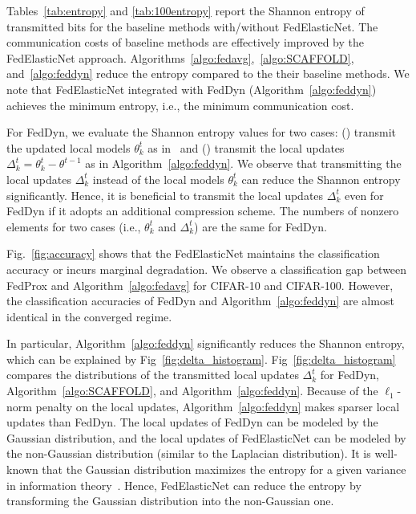 \documentclass{article} %
\begin{document}
Tables~\ref{tab:entropy} and \ref{tab:100entropy} report the Shannon entropy of transmitted bits for the baseline methods with/without FedElasticNet. The communication costs of baseline methods are effectively improved by the FedElasticNet approach. Algorithms~\ref{algo:fedavg},~\ref{algo:SCAFFOLD}, and~\ref{algo:feddyn} reduce the entropy compared to the their baseline methods. We note that FedElasticNet integrated with FedDyn (Algorithm~\ref{algo:feddyn}) achieves the minimum entropy, i.e., the minimum communication cost. 

For FedDyn, we evaluate the Shannon entropy values for two cases: ({}) transmit the updated local models $\theta_k^t$ as in~\citet{Acar2021federated} and ({}) transmit the local updates $\Delta_k^t = \theta_k^t - \theta^{t-1}$ as in Algorithm~\ref{algo:feddyn}. We observe that transmitting the local updates $\Delta_k^t$ instead of the local models $\theta_k^t$ can reduce the Shannon entropy significantly. Hence, it is beneficial to transmit the local updates $\Delta_k^t$ even for FedDyn if it adopts an additional compression scheme. The numbers of nonzero elements for two cases (i.e., $\theta_k^t$ and $\Delta_k^t$) are the same for FedDyn. 

Fig.~\ref{fig:accuracy} shows that the FedElasticNet maintains the classification accuracy or incurs marginal degradation. We observe a classification gap between FedProx and Algorithm~\ref{algo:fedavg} for CIFAR-10 and CIFAR-100. However, the classification accuracies of FedDyn and Algorithm~\ref{algo:feddyn} are almost identical in the converged regime. 


In particular, Algorithm~\ref{algo:feddyn} significantly reduces the Shannon entropy, which can be explained by Fig~\ref{fig:delta_histogram}. Fig~\ref{fig:delta_histogram} compares the distributions of the transmitted local updates $\Delta_k^t$ for FedDyn, Algorithm~\ref{algo:SCAFFOLD}, and Algorithm~\ref{algo:feddyn}. Because of the $\ell_1$-norm penalty on the local updates, Algorithm~\ref{algo:feddyn} makes sparser local updates than FedDyn. The local updates of FedDyn can be modeled by the Gaussian distribution, and the local updates of FedElasticNet can be modeled by the non-Gaussian distribution (similar to the Laplacian distribution). It is well-known that the Gaussian distribution maximizes the entropy for a given variance in information theory~\cite{Cover2006elements}. Hence, FedElasticNet can reduce the entropy by transforming the Gaussian distribution into the non-Gaussian one. 
\end{document}
